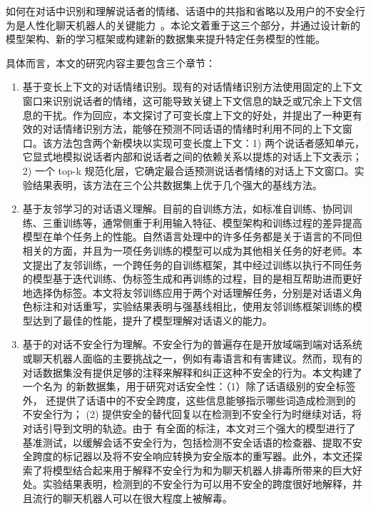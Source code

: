 \begin{cabstract}
如何在对话中识别和理解说话者的情绪、话语中的共指和省略以及用户的不安全行为是人性化聊天机器人的关键能力~\cite{cn1,cn2}。本论文着重于这三个部分，并通过设计新的模型架构、新的学习框架或构建新的数据集来提升特定任务模型的性能。

具体而言，本文的研究内容主要包含三个章节：

\begin{enumerate}

    \item 基于变长上下文的对话情绪识别。现有的对话情绪识别方法使用固定的上下文窗口来识别说话者的情绪，这可能导致关键上下文信息的缺乏或冗余上下文信息的干扰。作为回应，本文探讨了可变长度上下文的好处，并提出了一种更有效的对话情绪识别方法，能够在预测不同话语的情绪时利用不同的上下文窗口。该方法包含两个新模块以实现可变长度上下文：1) 两个说话者感知单元，它显式地模拟说话者内部和说话者之间的依赖关系以提炼的对话上下文表示；2) 一个 top-k 规范化层，它确定最合适预测说话者情绪的对话上下文窗口。实验结果表明，该方法在三个公共数据集上优于几个强大的基线方法。

    \item 基于友邻学习的对话语义理解。目前的⾃训练方法，如标准⾃训练、协同训练、三重训练等，通常侧重于利用输入特征、模型架构和训练过程的差异提高模型在单个任务上的性能。⾃然语⾔处理中的许多任务都是关于语⾔的不同但相关的⽅⾯，并且为⼀项任务训练的模型可以成为其他相关任务的好⽼师。本文提出了友邻训练，一个跨任务的⾃训练框架，其中经过训练以执行不同任务的模型基于迭代训练、伪标签生成和再训练的过程，目的是相互帮助进而更好地选择伪标签。本文将友邻训练应用于两个对话理解任务，分别是对话语义角色标注和对话重写，实验结果表明与强基线相比，使⽤友邻训练框架训练的模型达到了最佳的性能，提升了模型理解对话语义的能力。

    \item 基于\data{}的对话不安全行为理解。不安全行为的普遍存在是开放域端到端对话系统或聊天机器人面临的主要挑战之一，例如有毒语言和有害建议。然而，现有的对话数据集没有提供足够的注释来解释和纠正这种不安全的行为。本文构建了一个名为 \data{} 的新数据集，用于研究对话安全性：（1）除了话语级别的安全标签外，\data{} 还提供了话语中的不安全跨度，这些信息能够指示哪些词造成检测到的不安全行为； (2) \data{} 提供安全的替代回复以在检测到不安全行为时继续对话，将对话引导到文明的轨迹。由于 \data{} 有全面的标注，本文对三个强大的模型进行了基准测试，以缓解会话不安全行为，包括检测不安全话语的检查器、提取不安全跨度的标记器以及将不安全响应转换为安全版本的重写器。此外，本文还探索了将模型结合起来用于解释不安全行为和为聊天机器人排毒所带来的巨大好处。实验结果表明，检测到的不安全行为可以用不安全的跨度很好地解释，并且流行的聊天机器人可以在很大程度上被解毒。
    

\end{enumerate}
\end{cabstract}
